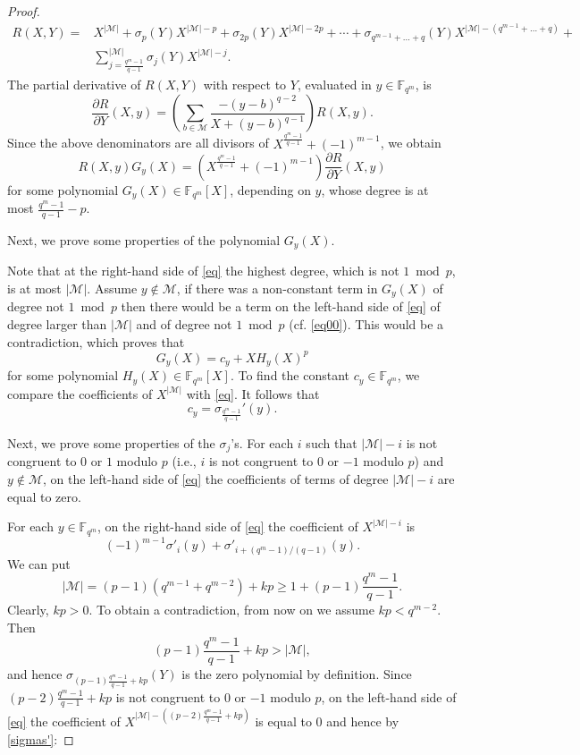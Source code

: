 \documentclass[12pt]{article}
\newcommand{\cM}{{\mathcal M}}
\newcommand{\F}{{\mathbb F}}
\begin{document}
\begin{proof}
	\begin{equation}
		\label{R(X,Y)}
		\begin{split}
			R(X,Y)=&X^{|\cM|}+\sigma_p(Y)X^{|\cM|-p}+\sigma_{2p}(Y)X^{|\cM|-2p}+
			\cdots + \sigma_{q^{m-1}+\ldots+q}(Y)X^{|\cM|-(q^{m-1}+\ldots+q)}+\\
			&\sum^{\vert \cM \vert}_{j=\frac{q^{m}-1}{q-1}}\sigma_{j}(Y)X^{\vert \cM \vert -j}.
		\end{split}
	\end{equation}
	The partial derivative of $R(X,Y)$ with respect to $Y$, evaluated in $y \in \F_{q^m}$, is 
	\[\frac{\partial R}{\partial Y}(X,y)=
	\left(\sum_{b\in \cM} \frac{-(y-b)^{q-2}}{X+(y-b)^{q-1}} \right)R(X,y).\]
	Since the above denominators are all divisors of $X^{\frac{q^{m}-1}{q-1}}+(-1)^{m-1}$, we obtain
	\begin{equation}
		\label{eq}
		R(X,y)G_y(X)=(X^{\frac{q^{m}-1}{q-1}}+(-1)^{m-1})\frac{\partial R}{\partial Y}(X,y)
	\end{equation}
	for some polynomial $G_y(X)\in \F_{q^m}[X]$,  depending on $y$, whose degree is at most $\frac{q^{m}-1}{q-1}-p$.
	
	Next, we prove some properties of the polynomial $G_y(X)$.
	
	Note that at the right-hand side of \eqref{eq} the highest degree, which is not $1 \bmod p$, is at most $|\cM|$.
	Assume $y \notin \cM$, if there was a non-constant term in $G_y(X)$ of degree not $1 \bmod p$ then there would be a term on the left-hand side of \eqref{eq} of degree larger than $|\cM|$ and of degree not $1 \bmod p$ (cf. \eqref{eq00}). This would be a contradiction, which proves that
	\[G_y(X)=c_y+X H_y(X)^p\]
	for some polynomial $H_y(X)\in \F_{q^m}[X]$. To find the constant $c_y \in \F_{q^m}$,  we compare the coefficients of $X^{|\cM|}$ with \eqref{eq}.
	It follows that \[c_y=\sigma_{\frac{q^{m}-1}{q-1}}'(y).\]
	
	\noindent Next, we prove some properties of the $\sigma_j$'s. For each $i$ such that $|\cM|-i$ is not congruent to $0$ or $1$ modulo $p$ (i.e., $i$ is not congruent to $0$ or $-1$ modulo $p$) and $y\notin \cM$, on the left-hand side of \eqref{eq} the coefficients of terms of degree $|\cM|-i$ are equal to zero. 
	
	For each $y \in \F_{q^m}$, on the right-hand side of \eqref{eq} the coefficient of $X^{|\cM|-i}$ is 
	\begin{equation}\label{sigmas'}
		(-1)^{m-1}\sigma'_{i}(y)+\sigma'_{i+(q^m-1)/(q-1)}(y).
	\end{equation}
	We can put
	\[|\cM|=(p-1)(q^{m-1}+q^{m-2})+kp\geq 1+(p-1)\frac{q^m-1}{q-1}.\] 
	Clearly, $kp>0$. To obtain a contradiction, from now on we assume $kp< q^{m-2}$.
	Then
	\begin{equation}\label{sizeM}
		(p-1)\frac{q^{m}-1}{q-1}+kp > |\cM|,
	\end{equation} 
	and hence $\sigma_{(p-1)\frac{q^m-1}{q-1}+kp}(Y)$ is the zero polynomial by definition. Since $(p-2)\frac{q^m-1}{q-1}+kp$ is not congruent to $0$ or $-1$ modulo $p$, on the left-hand side of \eqref{eq} the coefficient of $X^{|\cM|-((p-2)\frac{q^m-1}{q-1}+kp)}$ is equal to $0$ and hence by \eqref{sigmas'}:
	

\end{proof}
\end{document}
